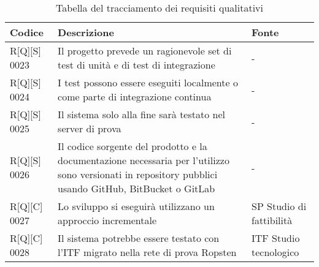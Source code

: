     \begin{center}
        \begin{longtable}{|p{2cm}|p{9cm}|p{2cm}|}%
        \caption{Tabella del tracciamento dei requisiti qualitativi}
        \label{tab:requisiti-qualitativi-sp}
        \endfirsthead
        \endhead
        \hline
        \textbf{Codice} & \textbf{Descrizione} & \textbf{Fonte}\\
        \hline
        R[Q][S] 0023    & Il progetto prevede un ragionevole set di test di unità e di test di integrazione & - \\
        \hline
        R[Q][S] 0024   & I test possono essere eseguiti localmente o come parte di integrazione continua & - \\
        \hline
        R[Q][S] 0025    & Il sistema solo alla fine sarà testato nel server di prova & - \\
        \hline
        R[Q][S] 0026    & Il codice sorgente del prodotto e la documentazione necessaria per l’utilizzo sono versionati in repository pubblici usando GitHub, BitBucket o GitLab & - \\
        \hline
        R[Q][C] 0027    & Lo sviluppo si eseguirà utilizzano un approccio incrementale  & SP Studio di fattibilità \\
        \hline
        R[Q][C] 0028    & Il sistema potrebbe essere testato con l’ITF migrato nella rete di prova Ropsten  & ITF Studio tecnologico \\
        \hline
        \end{longtable}
        \end{center}%




